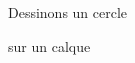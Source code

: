 \documentclass[preview]{standalone}
\begin{document}
\begin{center}
Dessinons un cercle
        
sur un calque
\end{center}
\end{document}

